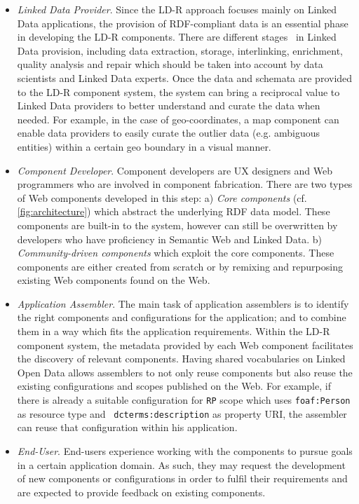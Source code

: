 \documentclass{llncs}
\begin{document}
\begin{itemize}

\item \emph{Linked Data Provider}.
Since the LD-R approach focuses mainly on Linked Data applications, the provision of RDF-compliant data is an essential phase in developing the LD-R components.
There are different stages~\cite{AuerLOD2} in Linked Data provision, including data extraction, storage, interlinking, enrichment, quality analysis and repair which should be taken into account by data scientists and Linked Data experts.
Once the data and schemata are provided to the LD-R component system, the system can bring a reciprocal value to Linked Data providers to better understand and curate the data when needed.
For example, in the case of geo-coordinates, a map component can enable data providers to easily curate the outlier data (e.g. ambiguous entities) within a certain geo boundary in a visual manner.

\item \emph{Component Developer}.
Component developers are UX designers and Web programmers who are involved in component fabrication.
There are two types of Web components developed in this step:
a) \emph{Core components} (cf. \autoref{fig:architecture}) which abstract the underlying RDF data model.
These components are built-in to the system, however can still be overwritten by developers who have proficiency in Semantic Web and Linked Data.
b) \emph{Community-driven components} which exploit the core components.
These components are either created from scratch or by remixing and repurposing existing Web components found on the Web.

\item \emph{Application Assembler}.
The main task of application assemblers is to identify the right components and configurations for the application; and to combine them in a way which fits the application requirements.
Within the LD-R component system, the metadata provided by each Web component facilitates the discovery of relevant components.
Having shared vocabularies on Linked Open Data allows assemblers to not only reuse components but also reuse the existing configurations and scopes published on the Web.
For example, if there is already a suitable configuration for \texttt{RP} scope which uses \texttt{foaf:Person} as resource type and ~\texttt{dcterms:description} as property URI, the assembler can reuse that configuration within his application.

\item \emph{End-User}.
End-users experience working with the components to pursue goals in a certain application domain.
As such, they may request the development of new components or configurations in order to fulfil their requirements and are expected to provide feedback on existing components.

\end{itemize}
\end{document}

